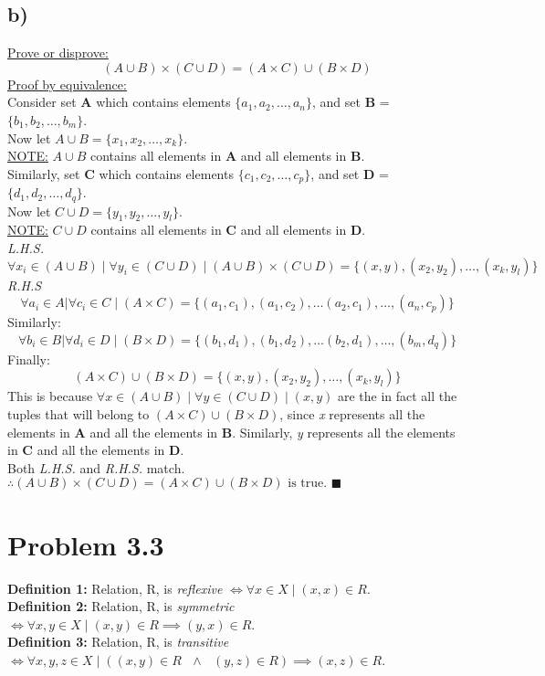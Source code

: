 \documentclass{article}
\begin{document}
\subsection*{b)}
\underline{Prove or disprove:} \[(A \cup B) \times (C \cup D) = (A \times C) \cup (B \times D) \]
\underline{Proof by equivalence:} \\
Consider set \textbf{A} which contains elements $\{ a_1, a_2, \dots, a_n \}$, and set \textbf{B} = $\{ b_1, b_2, \dots, b_m \}$. \\
Now let $A \cup B = \{ x_1, x_2, \dots, x_k \}$. \\
\underline{NOTE:} $A \cup B$ contains all elements in \textbf{A} and all elements in \textbf{B}.\\
Similarly, set \textbf{C} which contains elements $\{ c_1, c_2, \dots, c_p \}$, and set \textbf{D} = $\{ d_1, d_2, \dots, d_q \}$. \\
Now let $C \cup D = \{ y_1, y_2, \dots, y_l \}$. \\
\underline{NOTE:} $C \cup D$ contains all elements in \textbf{C} and all elements in \textbf{D}.\\
\textit{L.H.S.} \\
\[
    \forall x_i \in (A \cup B) \mid \forall y_i \in (C \cup D) \mid (A \cup B) \times (C \cup D) = \{ (x, y), (x_2, y_2), \dots, (x_k, y_l) \}
\]
\textit{R.H.S} \\
\[
    \forall a_i \in A | \forall c_i \in C \mid (A \times C) = \{ (a_1, c_1), (a_1, c_2), \dots (a_2, c_1), \dots, (a_n, c_p) \}
\]
Similarly: \\
\[
    \forall b_i \in B | \forall d_i \in D \mid (B \times D) = \{ (b_1, d_1), (b_1, d_2), \dots (b_2, d_1), \dots, (b_m, d_q) \}
\]
Finally: \\
\[
    (A \times C) \cup (B \times D) = \{ (x, y), (x_2, y_2), \dots, (x_k, y_l) \}
\]
This is because $\forall x \in (A \cup B) \mid \forall y \in (C \cup D) \mid (x, y)$ are the in fact all the tuples that will belong to $(A \times C) \cup (B \times D)$,
since \textit{x} represents all the elements in \textbf{A} and all the elements in \textbf{B}. 
Similarly, \textit{y} represents all the elements in \textbf{C} and all the elements in \textbf{D}. \\
Both \textit{L.H.S.} and \textit{R.H.S.} match. \\
$\therefore (A \cup B) \times (C \cup D) = (A \times C) \cup (B \times D) \text{ is true. } \blacksquare $ \\

\section*{Problem 3.3}
\textbf{Definition 1:} Relation, R, is \textit{reflexive} $\iff \forall x \in X \mid (x, x) \in R$. \\
\textbf{Definition 2:} Relation, R, is \textit{symmetric} $\iff \forall x, y \in X \mid (x, y) \in R \implies (y, x) \in R$. \\
\textbf{Definition 3:} Relation, R, is \textit{transitive} $\iff \forall x, y, z \in X \mid ((x, y) \in R \text{ } \land \text{ } (y, z) \in R) \implies (x, z) \in R$. \\
\end{document}
